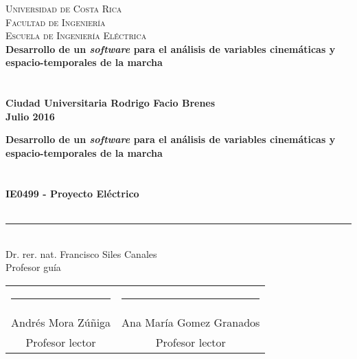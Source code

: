 \documentclass[11pt, letterpaper, twoside, openright]{book}
\begin{document}
\frontmatter
\pagestyle{plain}

\thispagestyle{empty}
\begin{center}
     \Large\textsc{Universidad de Costa Rica \\ Facultad de Ingeniería \\ Escuela de Ingeniería Eléctrica} \\
    \vspace{6cm}
    \LARGE\bfseries{Desarrollo de un \emph{software} para el análisis de variables cinemáticas y espacio-temporales de la marcha} \\
    \vspace{2cm}
    \large{} \\
    \vspace{0.5cm}
    \Large{} \\
    \vfill
    \large{Ciudad Universitaria Rodrigo Facio Brenes}\\
    \vspace{0.5cm}
    \large{Julio 2016}
\end{center}
\newpage\null\thispagestyle{empty}\newpage

\thispagestyle{empty}
\begin{center}
    \LARGE\bfseries{Desarrollo de un \emph{software} para el análisis de variables cinemáticas y espacio-temporales de la marcha} \\
    \vspace{2cm}
    \large{} \\
    \vspace{0.5cm}
    \Large{} \\
    \vfill
    \large\bfseries{IE0499 - Proyecto Eléctrico} \\
    \vspace{0.5cm}
    \large{} \\
    \vspace{4cm}
    \rule{6cm}{0.1pt}\\
    \normalfont\large{Dr. rer. nat. Francisco Siles Canales} \\
    \normalfont\large{Profesor guía} \\
    \vspace{2cm} 
    \begin{table}[!h]
        \centering
        \begin{tabular}{cc}
            \rule{6cm}{0.1pt}  & \rule{6cm}{0.1pt} \\
            Andrés Mora Zúñiga & Ana María Gomez Granados \\
            Profesor lector    & Profesor lector \\
        \end{tabular}
    \end{table}
\end{center}
\end{document}
